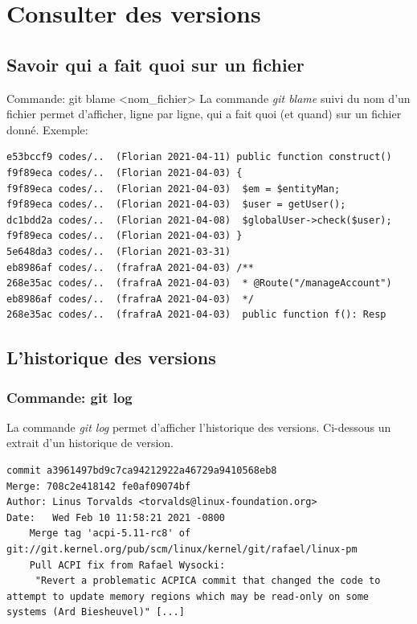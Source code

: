 \documentclass{beamer}
\begin{document}
\section{Consulter des versions}

\subsection{Savoir qui a fait quoi sur un fichier}

\begin{frame}[fragile]{Commande: git blame <nom\_fichier>}
La commande \textit{git blame} suivi du nom d'un fichier permet d'afficher, ligne par ligne, qui a fait quoi (et quand) sur un fichier donné. Exemple:
\begin{mdframed}[style=Bash]
\begin{lstlisting}[style=Bash, caption={Exemple de git blame}]
e53bccf9 codes/..  (Florian 2021-04-11) public function construct()
f9f89eca codes/..  (Florian 2021-04-03) {
f9f89eca codes/..  (Florian 2021-04-03)  $em = $entityMan;
f9f89eca codes/..  (Florian 2021-04-03)  $user = getUser();
dc1bdd2a codes/..  (Florian 2021-04-08)  $globalUser->check($user);
f9f89eca codes/..  (Florian 2021-04-03) }
5e648da3 codes/..  (Florian 2021-03-31) 
eb8986af codes/..  (frafraA 2021-04-03) /**
268e35ac codes/..  (frafraA 2021-04-03)  * @Route("/manageAccount")
eb8986af codes/..  (frafraA 2021-04-03)  */
268e35ac codes/..  (frafraA 2021-04-03)  public function f(): Resp
\end{lstlisting}
\end{mdframed}
\end{frame}

\subsection{L'historique des versions}
\begin{frame}[fragile]
\frametitle{Commande: git log}

La commande \textit{git log} permet d'afficher l'historique des versions. Ci-dessous un extrait d'un historique de version.
\begin{mdframed}[style=Bash]
    \begin{lstlisting}[style=Bash, caption={Exemple de bon message de commit}]
commit a3961497bd9c7ca94212922a46729a9410568eb8
Merge: 708c2e418142 fe0af09074bf
Author: Linus Torvalds <torvalds@linux-foundation.org>
Date:   Wed Feb 10 11:58:21 2021 -0800
    Merge tag 'acpi-5.11-rc8' of git://git.kernel.org/pub/scm/linux/kernel/git/rafael/linux-pm
    Pull ACPI fix from Rafael Wysocki:
     "Revert a problematic ACPICA commit that changed the code to attempt to update memory regions which may be read-only on some systems (Ard Biesheuvel)" [...]
    \end{lstlisting}
\end{mdframed}
\end{frame}
\end{document}
